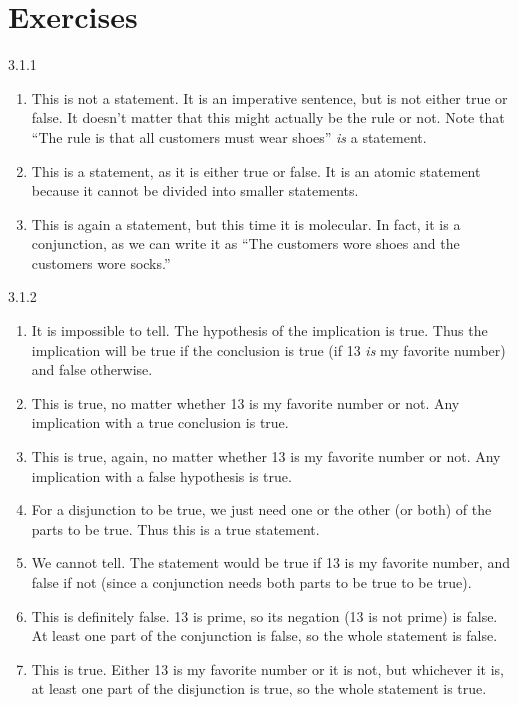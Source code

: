 \documentclass[11pt,]{book}
\theoremstyle{ptxplainnotitle}
\theoremstyle{ptxplaintitle}
\theoremstyle{ptxdefinitionnotitle}
\theoremstyle{ptxdefinitiontitle}
\theoremstyle{ptxdefinitionnotitle}
\theoremstyle{ptxdefinitiontitle}
\theoremstyle{ptxdefinitionnotitle}
\theoremstyle{ptxdefinitiontitle}
\theoremstyle{ptxdefinitiontitlenonumber}
\theoremstyle{ptxdefinitiontitlenonumber}
\numberwithin{equation}{chapter}
\begin{document}
\section*{Exercises}
\begin{divisionexercise}{3.1.1}
\textbf{}\hypertarget{p-1845}{}%
\leavevmode%
\begin{enumerate}[label=(\alph*)]
\item\hypertarget{li-798}{}\hypertarget{p-1846}{}%
This is not a statement.  It is an imperative sentence, but is not either true or false.  It doesn't matter that this might actually be the rule or not.  Note that ``The rule is that all customers must wear shoes'' \emph{is} a statement.%
\item\hypertarget{li-799}{}\hypertarget{p-1847}{}%
This is a statement, as it is either true or false.  It is an atomic statement because it cannot be divided into smaller statements.%
\item\hypertarget{li-800}{}\hypertarget{p-1848}{}%
This is again a statement, but this time it is molecular.  In fact, it is a conjunction, as we can write it as ``The customers wore shoes and the customers wore socks.''%
\end{enumerate}
%
\end{divisionexercise}%
\begin{divisionexercise}{3.1.2}
\textbf{}\hypertarget{p-1901}{}%
\leavevmode%
\begin{enumerate}[label=(\alph*)]
\item\hypertarget{li-850}{}\hypertarget{p-1902}{}%
It is impossible to tell.  The hypothesis of the implication is true.  Thus the implication will be true if the conclusion is true (if 13 \emph{is} my favorite number) and false otherwise.%
\item\hypertarget{li-851}{}\hypertarget{p-1903}{}%
This is true, no matter whether 13 is my favorite number or not.  Any implication with a true conclusion is true.%
\item\hypertarget{li-852}{}\hypertarget{p-1904}{}%
This is true, again, no matter whether 13 is my favorite number or not.  Any implication with a false hypothesis is true.%
\item\hypertarget{li-853}{}\hypertarget{p-1905}{}%
For a disjunction to be true, we just need one or the other (or both) of the parts to be true.  Thus this is a true statement.%
\item\hypertarget{li-854}{}\hypertarget{p-1906}{}%
We cannot tell.  The statement would be true if 13 is my favorite number, and false if not (since a conjunction needs both parts to be true to be true).%
\item\hypertarget{li-855}{}\hypertarget{p-1907}{}%
This is definitely false.  13 is prime, so its negation (13 is not prime) is false.  At least one part of the conjunction is false, so the whole statement is false.%
\item\hypertarget{li-856}{}\hypertarget{p-1908}{}%
This is true.  Either 13 is my favorite number or it is not, but whichever it is, at least one part of the disjunction is true, so the whole statement is true.%
\end{enumerate}
%
\end{divisionexercise}%
\end{document}

